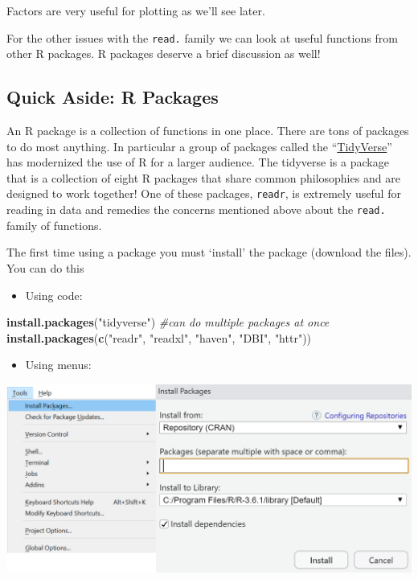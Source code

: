\documentclass[
]{book}
\newenvironment{Shaded}{\begin{snugshade}}{\end{snugshade}}
\newcommand{\CommentTok}[1]{\textcolor[rgb]{0.56,0.35,0.01}{\textit{#1}}}
\newcommand{\KeywordTok}[1]{\textcolor[rgb]{0.13,0.29,0.53}{\textbf{#1}}}
\newcommand{\NormalTok}[1]{#1}
\newcommand{\StringTok}[1]{\textcolor[rgb]{0.31,0.60,0.02}{#1}}
\providecommand{\tightlist}{%
  \setlength{\itemsep}{0pt}\setlength{\parskip}{0pt}}
\theoremstyle{definition}
\theoremstyle{definition}
\theoremstyle{definition}
\theoremstyle{remark}
\begin{document}
Factors are very useful for plotting as we'll see later.

For the other issues with the \texttt{read.} family we can look at useful functions from other R packages. R packages deserve a brief discussion as well!

\hypertarget{quick-aside-r-packages-1}{%
\subsection{Quick Aside: R Packages}\label{quick-aside-r-packages-1}}

An R package is a collection of functions in one place. There are tons of packages to do most anything. In particular a group of packages called the ``\href{http://tidyverse.org/}{TidyVerse}'' has modernized the use of R for a larger audience. The tidyverse is a package that is a collection of eight R packages that share common philosophies and are designed to work together! One of these packages, \texttt{readr}, is extremely useful for reading in data and remedies the concerns mentioned above about the \texttt{read.} family of functions.

The first time using a package you must `install' the package (download the files). You can do this

\begin{itemize}
\tightlist
\item
  Using code:
\end{itemize}

\begin{Shaded}
\begin{Highlighting}[]
\KeywordTok{install.packages}\NormalTok{(}\StringTok{"tidyverse"}\NormalTok{)}
\CommentTok{#can do multiple packages at once}
\KeywordTok{install.packages}\NormalTok{(}\KeywordTok{c}\NormalTok{(}\StringTok{"readr"}\NormalTok{, }\StringTok{"readxl"}\NormalTok{, }\StringTok{"haven"}\NormalTok{, }\StringTok{"DBI"}\NormalTok{, }\StringTok{"httr"}\NormalTok{))}
\end{Highlighting}
\end{Shaded}

\begin{itemize}
\tightlist
\item
  Using menus:
\end{itemize}

\begin{center}\includegraphics[width=0.7\linewidth]{img/packages} \end{center}
\end{document}
